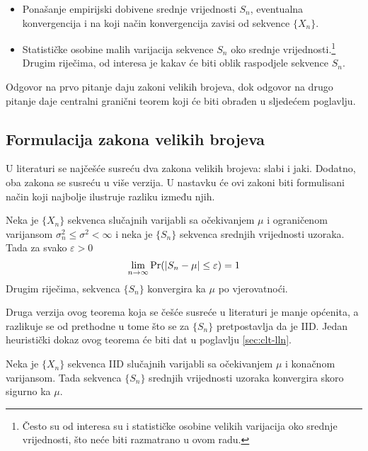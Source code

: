 \begin{itemize}
  \item Ponašanje empirijski dobivene srednje vrijednosti $S_n$, eventualna
    konvergencija i na koji način konvergencija zavisi od sekvence $\{X_n\}$.
  \item Statističke osobine malih varijacija sekvence $S_n$ oko srednje
    vrijednosti.\footnote{Često su od interesa su i statističke osobine velikih
    varijacija oko srednje vrijednosti, što neće biti razmatrano u ovom radu.}
    Drugim riječima, od interesa je kakav će biti oblik raspodjele sekvence $S_n$.
\end{itemize}

Odgovor na prvo pitanje daju zakoni velikih brojeva, dok odgovor na drugo
pitanje daje centralni granični teorem koji će biti obrađen u sljedećem
poglavlju.

\subsection{Formulacija zakona velikih brojeva}%

 U literaturi se najčešće susreću dva zakona velikih brojeva: slabi i
jaki. Dodatno, oba zakona se susreću u više verzija. U nastavku će ovi zakoni
biti formulisani način koji najbolje ilustruje razliku između njih.

\begin{theorem}
  Neka je $\{X_n\}$ sekvenca slučajnih varijabli sa očekivanjem $\mu$ i
  ograničenom varijansom $\sigma_n^2 \le \sigma^2 < \infty$ i neka je $\{S_n\}$
  sekvenca srednjih vrijednosti uzoraka. Tada za svako $\varepsilon>0$
  \begin{equation}
    \lim_{n\to\infty} \mathrm{Pr}(|S_n - \mu| \le \varepsilon) = 1
  \end{equation}
  Drugim riječima, sekvenca $\{S_n\}$ konvergira ka $\mu$ po vjerovatnoći.
\end{theorem}

Druga verzija ovog teorema koja se češće susreće u literaturi je manje općenita,
a razlikuje se od prethodne u tome što se za $\{S_n\}$ pretpostavlja da je IID.
Jedan heuristički dokaz ovog teorema će biti dat u poglavlju \ref{sec:clt-lln}.

\begin{theorem}
  Neka je $\{X_n\}$ sekvenca IID slučajnih varijabli sa očekivanjem $\mu$ i
  konačnom varijansom. Tada sekvenca $\{S_n\}$ srednjih vrijednosti uzoraka
  konvergira skoro sigurno ka $\mu$.
\end{theorem}


